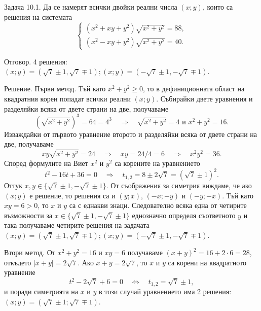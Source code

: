 
Задача 10.1. Да се намерят всички двойки реални числа $(x;y)$, които са решения на системата
$$
\begin{cases}
(x^2+xy+y^2)\sqrt{x^2+y^2}=88,\\
(x^2-xy+y^2)\sqrt{x^2+y^2}=40.
\end{cases}
$$

Отговор. 4 решения: $(x;y)=(\sqrt7\pm1,\sqrt7\mp1); (x;y)=(-\sqrt7\pm1,-\sqrt7\mp1)$.

Решение. Първи метод. Тъй като $x^2+y^2\geq0$, то в дефиниционната област на квадратния корен попадат всички реални $(x;y)$. Събирайки двете уравнения и разделяйки всяка от двете страни на две, получаваме
$$
\left(\sqrt{x^2+y^2}\right)^3=64=4^3\quad\Longrightarrow\quad \sqrt{x^2+y^2}=4\text{ и }x^2+y^2=16.
$$
Изваждайки от първото уравнение второто и разделяйки всяка от двете страни на две, получаваме
$$
xy\sqrt{x^2+y^2}=24\quad\Longrightarrow\quad xy=24/4=6\quad\Longrightarrow\quad x^2y^2=36.
$$
Според формулите на Виет $x^2$ и $y^2$ са корените на уравнението
$$
t^2-16t+36=0\quad\Longrightarrow\quad t_{1,2}=8\pm2\sqrt7=(\sqrt7\pm1)^2.
$$
Оттук $x,y\in\{\sqrt7\pm1,-\sqrt7\pm1\}$. От съображения за симетрия виждаме, че ако $(x;y)$ е решение, то решения са и $(y;x)$, $(-x;-y)$ и $(-y;-x)$. Тъй като $xy=6>0$, то $x$ и $y$ са с еднакви знаци. Следователно всяка една от четирите възможности за $x\in\{\sqrt7\pm1,-\sqrt7\pm1\}$ еднозначно определя съответното $y$ и така получаваме четирите решения на задачата $(x;y)=(\sqrt7\pm1,\sqrt7\mp1); (x;y)=(-\sqrt7\pm1,-\sqrt7\mp1)$.

Втори метод. От $x^2+y^2=16$ и $xy=6$ получаваме $(x+y)^2=16+2\cdot6=28$, откъдето $|x+y|=2\sqrt7$. Ако $x+y=2\sqrt7$, то $x$ и $y$ са корени на квадратното уравнение
$$
t^2-2\sqrt7+6=0\quad\Longleftrightarrow\quad t_{1,2}=\sqrt7\pm1,
$$
и поради симетрията на $x$ и $y$ в този случай уравнението има 2 решения: $(x;y)=(\sqrt7\pm1;\sqrt7\mp1)$.

